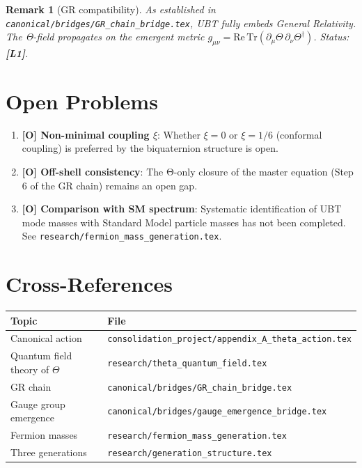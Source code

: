 \documentclass[11pt,a4paper]{article}
\newtheorem{remark}{Remark}
\begin{document}
\begin{remark}[GR compatibility]
  As established in \texttt{canonical/bridges/GR\_chain\_bridge.tex},
  UBT fully embeds General Relativity.  The Θ-field propagates on the
  emergent metric $g_{\mu\nu} = \mathrm{Re}\,\mathrm{Tr}(\partial_\mu\Theta\,\partial_\nu\Theta^\dagger)$.
  Status: \textbf{[L1]}.
\end{remark}

\section{Open Problems}
\label{sec:open}

\begin{enumerate}
  \item \textbf{[O] Non-minimal coupling $\xi$}: Whether $\xi = 0$ or
    $\xi = 1/6$ (conformal coupling) is preferred by the biquaternion
    structure is open.

  \item \textbf{[O] Off-shell consistency}: The Θ-only closure of the
    master equation (Step 6 of the GR chain) remains an open gap.

  \item \textbf{[O] Comparison with SM spectrum}: Systematic identification
    of UBT mode masses with Standard Model particle masses has not been
    completed.  See \texttt{research/fermion\_mass\_generation.tex}.
\end{enumerate}

\section{Cross-References}
\label{sec:xref}

\begin{tabular}{ll}
\hline
Topic & File \\
\hline
Canonical action & \texttt{consolidation\_project/appendix\_A\_theta\_action.tex} \\
Quantum field theory of $\Theta$ & \texttt{research/theta\_quantum\_field.tex} \\
GR chain & \texttt{canonical/bridges/GR\_chain\_bridge.tex} \\
Gauge group emergence & \texttt{canonical/bridges/gauge\_emergence\_bridge.tex} \\
Fermion masses & \texttt{research/fermion\_mass\_generation.tex} \\
Three generations & \texttt{research/generation\_structure.tex} \\
\hline
\end{tabular}
\end{document}
